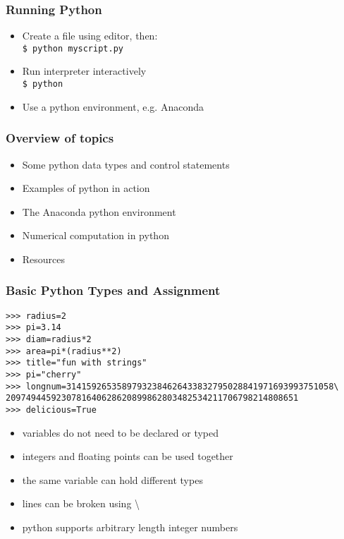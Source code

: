 \documentclass[10pt]{beamer}
\newcommand\smallfont{\fontsize{8pt}{7.2}\selectfont}
\begin{document}
\begin{frame}[fragile]
\frametitle{Running Python}
\begin{itemize}
\item Create a file using editor, then:
\\
\verb|$ python myscript.py |

\item Run interpreter interactively
\\
\verb|$ python |

\item Use a python environment, e.g. Anaconda
\end{itemize}
\end{frame}

\begin{frame}
\frametitle{Overview of topics}
\begin{itemize}
\item Some python data types and control statements
\item Examples of python in action
\item The Anaconda python environment
\item Numerical computation in python
\item Resources
\end{itemize}
\end{frame}
\begin{frame}[fragile]
\frametitle{Basic Python Types and Assignment}

\smallfont
\begin{verbatim}
>>> radius=2
>>> pi=3.14
>>> diam=radius*2
>>> area=pi*(radius**2)
>>> title="fun with strings"
>>> pi="cherry"
>>> longnum=31415926535897932384626433832795028841971693993751058\
2097494459230781640628620899862803482534211706798214808651
>>> delicious=True
\end{verbatim}

\begin{itemize}
\item variables do not need to be declared or typed
\item integers and floating points can be used together
\item the same variable can hold different types
\item lines can be broken using \textbackslash
\item python supports arbitrary length integer numbers
\end{itemize}
\end{frame}
\end{document}
